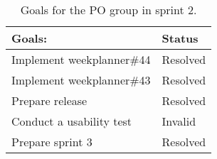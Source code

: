 \begin{table}[H]
    \centering
    \begin{tabular}{|l|l|}
    \hline
    Goals:                                   & Status \\ \hline
    Implement weekplanner\#44                & Resolved  \\ \hline
    Implement weekplanner\#43                & Resolved  \\ \hline
    Prepare release                          & Resolved \\ \hline
    Conduct a usability test                 & Invalid \\ \hline
    Prepare sprint 3                         & Resolved \\ \hline
    \end{tabular}
    \caption{Goals for the PO group in sprint 2.}
    \label{PO-goal-sprint-2-review}
\end{table}
